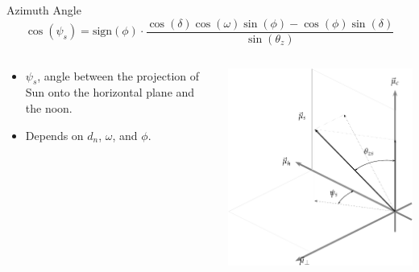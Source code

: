 \documentclass[xcolor={usenames,svgnames,dvipsnames}]{beamer}
\begin{document}
\begin{frame}[plain,label={sec:orgb228172}]{Azimuth Angle}
\[
  \cos(\psi_{s}) = \mathrm{sign}(\phi) \cdot \frac{\cos(\delta) \cos(\omega) \sin(\phi) - \cos(\phi) \sin(\delta)} {\sin(\theta_{z})}
\]

\begin{columns}
\begin{column}{0.55\columnwidth}
\begin{itemize}
\item \(\psi_s\), angle between the projection of Sun onto the horizontal plane and the noon.
\item Depends on \(d_n\), \(\omega\), and \(\phi\).
\end{itemize}
\end{column}

\begin{column}{0.75\columnwidth}
\begin{center}
\includegraphics[width=.9\linewidth]{../figs/SistemaCoordenadasLocal-crop.pdf}
\end{center}
\end{column}
\end{columns}
\end{frame}
\end{document}
